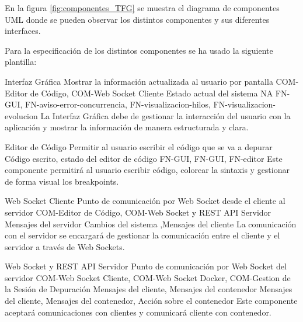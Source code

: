 En la figura \ref{fig:componentes_TFG} se muestra el diagrama de componentes UML \cite{Cook2017} donde se pueden observar los distintos componentes y sus diferentes interfaces.


Para la especificación de los distintos componentes se ha usado la siguiente plantilla: 

\printcomptemplate
\begin{component}{Interfaz Gráfica}
{Mostrar la información actualizada al usuario por pantalla}
{COM-Editor de Código, COM-Web Socket Cliente} %
{Estado actual del sistema} %
{NA} %
{FN-GUI, FN-aviso-error-concurrencia, FN-visualizacion-hilos, FN-visualizacion-evolucion} %
La Interfaz Gráfica debe de gestionar la interacción del usuario con la aplicación y mostrar la información de manera estructurada y clara. %
\end{component}

\begin{component}{Editor de Código}
    {Permitir al usuario escribir el código que se va a depurar}
    {\NA} %
    {\NA} %
    {Código escrito, estado del editor de código} %
    {FN-GUI, FN-GUI, FN-editor} %
    Este componente permitirá al usuario escribir código, colorear la sintaxis y gestionar de forma visual los breakpoints. %
\end{component}

\begin{component}{Web Socket Cliente}
{Punto de comunicación por Web Socket desde el cliente al servidor}
{COM-Editor de Código, COM-Web Socket y REST API Servidor} %
{Mensajes del servidor} %
{Cambios del sistema ,Mensajes del cliente} %
{} %
La comunicación con el servidor se encargará de gestionar la comunicación entre el cliente y el servidor a través de Web Sockets. %
\end{component}


\begin{component}{Web Socket y REST API Servidor}
{Punto de comunicación por Web Socket del servidor}
{COM-Web Socket Cliente, COM-Web Socket Docker, COM-Gestion de la Sesión de Depuración} %
{Mensajes del cliente, Mensajes del contenedor} %
{Mensajes del cliente, Mensajes del contenedor, Acción sobre el contenedor} %
{} %
Este componente aceptará comunicaciones con clientes y comunicará cliente con contenedor. %
\end{component}

